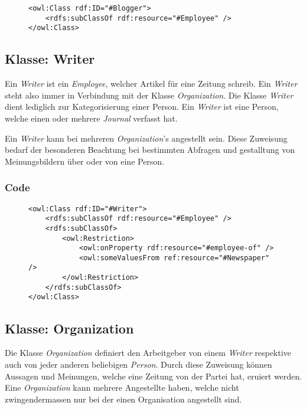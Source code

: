 \documentclass[
    11pt,
    latin1,
    a4paper,
    oneside
]{scrreprt}
\begin{document}
\begin{figure}[h]
 \lstset{language=XML}
 \begin{lstlisting}[label=owl:word]
<owl:Class rdf:ID="#Blogger">
    <rdfs:subClassOf rdf:resource="#Employee" />
</owl:Class>
 \end{lstlisting}
\end{figure}


\subsection{Klasse: Writer} \label{sec:class_writer}

Ein \emph{Writer} ist ein \emph{Employee}, welcher Artikel f\"ur eine Zeitung schreib. Ein \emph{Writer} steht also immer in Verbindung mit der Klasse \emph{Organization}. Die Klasse \emph{Writer} dient lediglich zur Kategorisierung einer Person. Ein \emph{Writer} ist eine Person, welche einen oder mehrere \emph{Journal} verfasst hat.

Ein \emph{Writer} kann bei mehreren \emph{Organization}'s angestellt sein. Diese Zuweisung bedarf der besonderen Beachtung bei bestimmten Abfragen und gestalltung von Meinungsbildern \"uber oder von eine Person.

\subsubsection{Code} \label{sec:class_writer_code}

\begin{figure}[h]
 \lstset{language=XML}
 \begin{lstlisting}[label=owl:word]
<owl:Class rdf:ID="#Writer">
    <rdfs:subClassOf rdf:resource="#Employee" />
	<rdfs:subClassOf>
		<owl:Restriction>
			<owl:onProperty rdf:resource="#employee-of" />
			<owl:someValuesFrom ref:resource="#Newspaper" />
		</owl:Restriction>
	</rdfs:subClassOf>
</owl:Class>
 \end{lstlisting}
\end{figure}


\subsection{Klasse: Organization} \label{sec:class_organization}

Die Klasse \emph{Organization} definiert den Arbeitgeber von einem \emph{Writer} respektive auch von jeder anderen beliebigen \emph{Person}. Durch diese Zuweisung k\"onnen Aussagen und Meinungen, welche eine Zeitung von der Partei hat, eruiert werden. Eine \emph{Organization} kann mehrere Angestellte haben, welche nicht zwingendermassen nur bei der einen Organisation angestellt sind.
\end{document}
